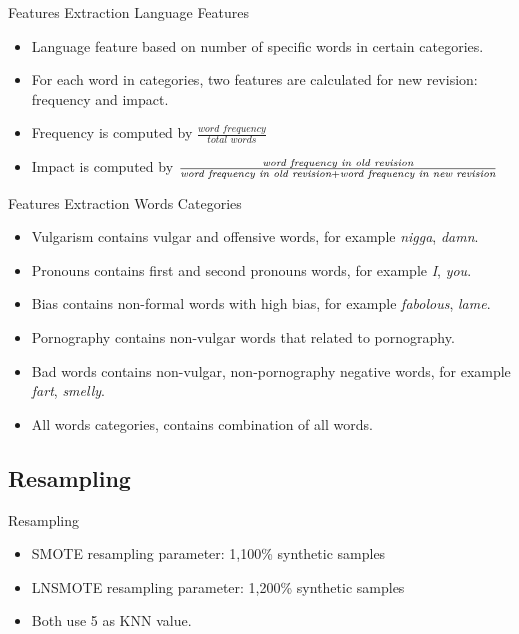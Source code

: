 \documentclass{beamer}
\begin{document}
\begin{frame}
	{Features Extraction}
	{Language Features}
	\begin{itemize}
		\item Language feature based on number of specific words in certain
		categories.
		\item For each word in categories, two features are calculated for new
		revision:
		frequency and impact.
		\item Frequency is computed by
			$\frac{\textit{word frequency}}
				{\textit{total words}}$
		\item Impact is computed by $\frac{%
				\textit{word frequency in old revision}
			}{
			\textit{word frequency in old revision}
				+ \textit{word frequency in new revision}
			} $
	\end{itemize}
\end{frame}

\begin{frame}
	{Features Extraction}
	{Words Categories}
	\begin{itemize}
		\item Vulgarism contains vulgar and offensive words, for example
		\textit{nigga}, \textit{damn}.
		\item Pronouns contains first and second pronouns words, for example
		\textit{I}, \textit{you}.
		\item Bias contains non-formal words with high bias, for example
		\textit{fabolous}, \textit{lame}.
		\item Pornography contains non-vulgar words that related to
		pornography.
		\item Bad words contains non-vulgar, non-pornography negative words,
		for example \textit{fart}, \textit{smelly}.
		\item All words categories, contains combination of all words.
	\end{itemize}
\end{frame}

\subsection{Resampling}

\begin{frame}
	{Resampling}
	\begin{itemize}
		\item SMOTE resampling parameter: 1,100\% synthetic samples
		\item LNSMOTE resampling parameter: 1,200\% synthetic samples
		\item Both use 5 as KNN value.
	\end{itemize}
	
\end{frame}
\end{document}
